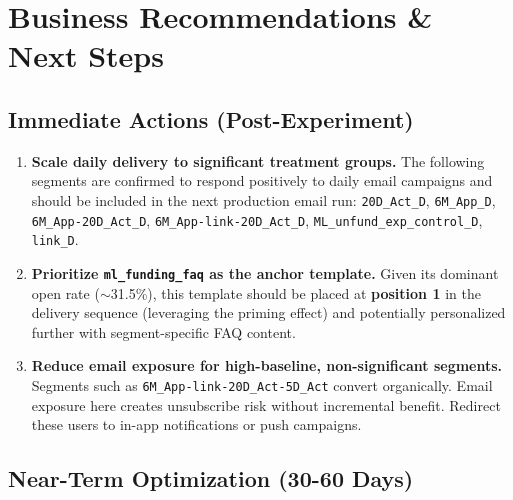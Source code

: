 \documentclass[12pt,a4paper]{article}
\begin{document}
\clearpage
\section{Business Recommendations \& Next Steps}

\subsection{Immediate Actions (Post-Experiment)}

\begin{enumerate}[leftmargin=2em, label=\textbf{\arabic*.}]

  \item \textbf{Scale daily delivery to significant treatment groups.}
    The following segments are confirmed to respond positively to daily email campaigns
    and should be included in the next production email run:
    \texttt{20D\_Act\_D}, \texttt{6M\_App\_D}, \texttt{6M\_App-20D\_Act\_D},
    \texttt{6M\_App-link-20D\_Act\_D}, \texttt{ML\_unfund\_exp\_control\_D},
    \texttt{link\_D}.

  \item \textbf{Prioritize \texttt{ml\_funding\_faq} as the anchor template.}
    Given its dominant open rate ($\sim$31.5\%), this template should be placed at
    \textbf{position 1} in the delivery sequence (leveraging the priming effect) and
    potentially personalized further with segment-specific FAQ content.

  \item \textbf{Reduce email exposure for high-baseline, non-significant segments.}
    Segments such as \texttt{6M\_App-link-20D\_Act-5D\_Act} convert organically.
    Email exposure here creates unsubscribe risk without incremental benefit.
    Redirect these users to in-app notifications or push campaigns.

\end{enumerate}

\subsection{Near-Term Optimization (30-60 Days)}
\end{document}
